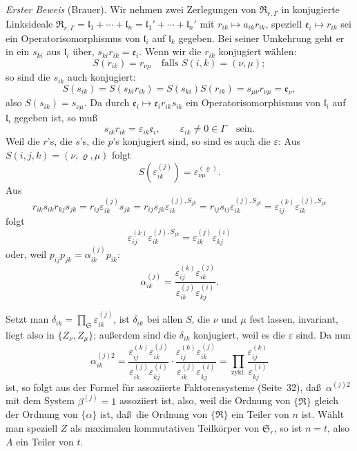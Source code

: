 \documentclass[12pt,a4paper]{article}
\theoremstyle{plain}
\theoremstyle{definition}
\theoremstyle{remark}
\begin{document}
\textit{Erster Beweis} (Brauer). Wir nehmen zwei Zerlegungen von
$\mathfrak{R}_{r,\varGamma}$ in konjugierte Linksideale
$\mathfrak{R}_{r,\varGamma} = \mathfrak{l}_{1} + \cdots + \mathfrak{l}_{n} = \mathfrak{l}_{1}' + \cdots + \mathfrak{l}_{n}'$
mit $r_{ik} \mapsto a_{ik}r_{ik}$, speziell $\mathfrak{e}_{i} \mapsto r_{ik}$ sei ein Operatorisomorphismus
von $\mathfrak{l}_{i}$ auf $\mathfrak{l}_{k}$ gegeben. Bei seiner Umkehrung geht er in ein
$s_{ki}$ aus $\mathfrak{l}_{i}$ \"uber, $s_{ki}r_{ik} = \mathfrak{e}_{i}$. Wenn wir die $r_{ik}$ konjugiert w\"ahlen:
\[
S(r_{ik}) = r_{\nu\mu} \quad \text{falls } S(i,k) = (\nu,\mu);
\]
so sind die $s_{ik}$ auch konjugiert:
\[
S(s_{ik}) = S(s_{ki}r_{ik}) = S(s_{ki})S(r_{ik}) = s_{\mu\nu}r_{\nu\mu} = \mathfrak{e}_{\nu},
\]
also $S(s_{ik}) = s_{\nu\mu}$. Da durch $\mathfrak{e}_{i} \mapsto \mathfrak{e}_{i}r_{ik}s_{ik}$ ein
Operatorisomorphismus von $\mathfrak{l}_{i}$ auf $\mathfrak{l}_{i}$ gegeben ist, so mu\ss
\[
s_{ik}r_{ik} = \varepsilon_{ik}\mathfrak{e}_{i}, \qquad \varepsilon_{ik} \neq 0 \in \varGamma \quad \text{sein}.
\]
Weil die $r$'s, die $s$'s, die $p$'s konjugiert sind, so sind es auch die $\varepsilon$:
Aus $S(i, j, k) = (\nu, \varrho, \mu)$ folgt
\[
S(\varepsilon_{ik}^{(j)}) = \varepsilon_{\nu\mu}^{(\varrho)}.
\]
Aus
\[
r_{ik}s_{ik}r_{kj}s_{jk} = r_{ij}\varepsilon_{ik}^{(j)}s_{jk} = r_{ij}s_{jk}\varepsilon_{ik}^{(j),S_{jk}}
= r_{ij}s_{ij}\varepsilon_{ik}^{(j),S_{jk}} = \varepsilon_{ij}^{(k)}\varepsilon_{ik}^{(j),S_{jk}}
\]
folgt
\[
\varepsilon_{ij}^{(k)}\varepsilon_{ik}^{(j),S_{jk}} = \varepsilon_{ik}^{(j)}\varepsilon_{kj}^{(i)}
\]
oder, weil $p_{ij}p_{jk} = \alpha_{ik}^{(j)}p_{ik}$:
\begin{equation}\label{eq:24-A}
\alpha_{ik}^{(j)} = \frac{\varepsilon_{ij}^{(k)}\varepsilon_{ik}^{(j)}}{\varepsilon_{ik}^{(j)}\varepsilon_{kj}^{(i)}}.
\end{equation}

Setzt man $\delta_{ik} = \prod_{\mathfrak{S}} \varepsilon_{ik}^{(j)}$, ist $\delta_{ik}$ bei allen $S$, die $\nu$ und $\mu$
fest lassen, invariant, liegt also in $\{Z_{\nu}, Z_{\mu}\}$; au\ss erdem sind die
$\delta_{ik}$ konjugiert, weil es die $\varepsilon$ sind. Da nun
\[
\alpha_{ik}^{(j)2} = \frac{\varepsilon_{ij}^{(k)}\varepsilon_{ik}^{(j)}}{\varepsilon_{ik}^{(j)}\varepsilon_{kj}^{(i)}}
\cdot \frac{\varepsilon_{ij}^{(k)}\varepsilon_{ik}^{(j)}}{\varepsilon_{ik}^{(j)}\varepsilon_{kj}^{(i)}}
= \prod_{\text{zykl.}} \frac{\varepsilon_{ij}^{(k)}}{\varepsilon_{kj}^{(i)}}
\]
ist, so folgt aus der Formel f\"ur assoziierte Faktorensysteme (Seite~32), da\ss\ $\alpha^{(j)2}$ mit dem System $\beta^{(j)} = 1$ assoziiert ist, also, weil die Ordnung
von $\{\mathfrak{R}\}$ gleich der Ordnung von $\{\alpha\}$ ist, da\ss\ die Ordnung von
$\{\mathfrak{R}\}$ ein Teiler von $n$ ist. W\"ahlt man speziell $Z$ als maximalen kommutativen
Teilk\"orper von $\mathfrak{S}_{r}$, so ist $n = t$, also $A$ ein Teiler von $t$.
\end{document}
